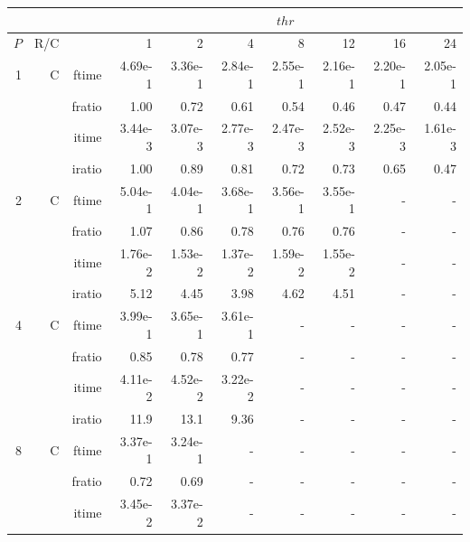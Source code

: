 \documentclass[a4paper]{article}
\begin{document}
\begin{table}[htbp]
\begin{center}
\begin{small}
\begin{tabular}{|r|r|r|r|r|r|r|r|r|r|}
\hline 
     & & & \multicolumn{7}{c|}{$thr$} \\ \hline
    $P$ & R/C &  & 1           & 2    & 4    & 8    & 12   & 16    & 24  \\ \hline\hline
   1 &   C &  ftime &    4.69e-1 &    3.36e-1 &    2.84e-1 &    2.55e-1 &    2.16e-1 &    2.20e-1 &    2.05e-1 \\
             &             &  fratio &    1.00 &   0.72 &   0.61 &    0.54 &    0.46 &    0.47 &    0.44 \\
             &             &  itime &    3.44e-3 &    3.07e-3 &    2.77e-3 &    2.47e-3 &    2.52e-3 &    2.25e-3 &    1.61e-3 \\
             &             &  iratio &    1.00 &    0.89 &   0.81 &   0.72 &    0.73 &    0.65 &    0.47 \\\hline
   2 &  C &  ftime &    5.04e-1 &    4.04e-1 &    3.68e-1 &    3.56e-1 &    3.55e-1 &      - &      - \\
             &             &  fratio &    1.07  &    0.86 &    0.78 &    0.76 &    0.76 &      - &      - \\
             &             &  itime &    1.76e-2 &    1.53e-2 &    1.37e-2 &    1.59e-2 &    1.55e-2 &      - &      - \\
             &             &  iratio &    5.12  &   4.45  &    3.98  &    4.62  &    4.51  &      - &      - \\\hline
   4 &  C &  ftime &    3.99e-1 &    3.65e-1 &    3.61e-1 &      - &      - &      - &      - \\
             &             &  fratio &    0.85 &    0.78 &    0.77 &      - &      - &      - &      - \\
             &             &  itime &    4.11e-2 &    4.52e-2 &    3.22e-2 &      - &      - &      - &      - \\
             &             &  iratio &    11.9 &   13.1 &   9.36  &      - &      - &      - &      - \\\hline
   8 &   C &  ftime &    3.37e-1 &    3.24e-1 &      - &      - &      - &      - &      - \\
             &             &  fratio &   0.72 &    0.69 &      - &      - &      - &      - &      - \\
             &             &  itime &    3.45e-2 &    3.37e-2 &      - &      - &      - &      - &      - \\

\end{tabular}
\end{small}
\end{center}
\end{table}
\end{document}
